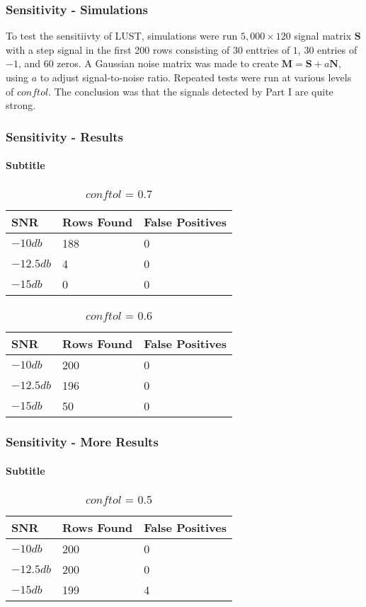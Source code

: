 \documentclass[
	11pt, %
]{beamer}
\begin{document}
\begin{frame}
    \frametitle{Sensitivity - Simulations}
    To test the sensitiivty of LUST, simulations were run $5,000 \times 120$ signal matrix $\mathbf{S}$ with a step signal in the first 200 rows consisting of 30 enttries of $1$, 30 entries of $-1$, and 60 zeros.
    \pause
    \bigskip
    A Gaussian noise matrix was made to create $\mathbf{M} = \mathbf{S} + a\mathbf{N}$, using $a$ to adjust signal-to-noise ratio.
    \pause
    \bigskip
    Repeated tests were run at various levels of $conftol$. 
    \pause
    \bigskip
    The conclusion was that the signals detected by Part I are quite strong.
\end{frame}

\begin{frame}
	\frametitle{Sensitivity - Results}
	\framesubtitle{Subtitle} %
	
	\begin{table}
		\begin{tabular}{l l l}
			\toprule
			\textbf{SNR} & \textbf{Rows Found} & \textbf{False Positives}\\
			\midrule
			$-10db$ & 188 & 0 \\
			$-12.5db$ & 4 & 0 \\
			$-15db$ & 0 & 0 \\
			\bottomrule
		\end{tabular}
		\caption{$conftol$ = 0.7}
	\end{table}
    \pause
    \begin{table}
		\begin{tabular}{l l l}
			\toprule
			\textbf{SNR} & \textbf{Rows Found} & \textbf{False Positives}\\
			\midrule
			$-10db$ & 200 & 0 \\
			$-12.5db$ & 196 & 0 \\
			$-15db$ & 50 & 0 \\
			\bottomrule
		\end{tabular}
		\caption{$conftol$ = 0.6}
	\end{table}
\end{frame}

\begin{frame}
	\frametitle{Sensitivity - More Results}
	\framesubtitle{Subtitle} %
	
	\begin{table}
		\begin{tabular}{l l l}
			\toprule
			\textbf{SNR} & \textbf{Rows Found} & \textbf{False Positives}\\
			\midrule
			$-10db$ & 200 & 0 \\
			$-12.5db$ & 200 & 0 \\
			$-15db$ & 199 & 4 \\
			\bottomrule
		\end{tabular}
		\caption{$conftol$ = 0.5}
	\end{table}
\end{frame}
\end{document}
